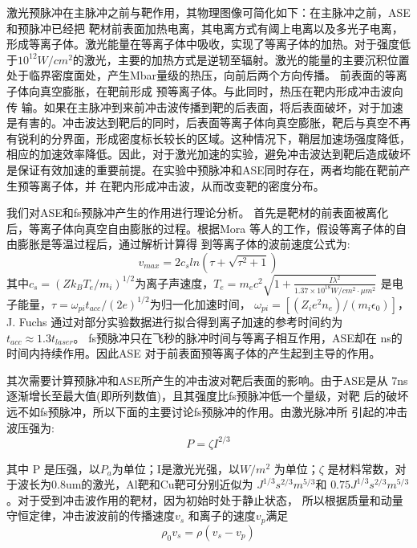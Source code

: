 激光预脉冲在主脉冲之前与靶作用，其物理图像可简化如下：在主脉冲之前，ASE和预脉冲已经把
靶材前表面加热电离，其电离方式有阈上电离以及多光子电离，形成等离子体。激光能量在等离子体中吸收，实现了等离子体的加热。对于强度低于$10^12W/{cm}^2$的激光，主要的加热方式是逆轫至辐射。激光的能量的主要沉积位置处于临界密度面处，产生Mbar量级的热压，向前后两个方向传播。 前表面的等离子体向真空膨胀，在靶前形成
预等离子体。与此同时，热压在靶内形成冲击波向传
输。如果在主脉冲到来前冲击波传播到靶的后表面，将后表面破坏，对于加速是有害的。冲击波达到靶后的同时，后表面等离子体向真空膨胀，靶后与真空不再有锐利的分界面，形成密度标长较长的区域。这种情况下，鞘层加速场强度降低，相应的加速效率降低。因此，对于激光加速的实验，避免冲击波达到靶后造成破坏是保证有效加速的重要前提。在实验中预脉冲和ASE同时存在，两者均能在靶前产生预等离子体，并
在靶内形成冲击波，从而改变靶的密度分布。


我们对ASE和fs预脉冲产生的作用进行理论分析。
首先是靶材的前表面被离化后，等离子体向真空自由膨胀的过程。根据Mora
等人的工作\cite{mora2003plasma,mora2005thin}，假设等离子体的自由膨胀是等温过程后，通过解析计算得
到等离子体的波前速度公式为:
\begin{equation}
\label{eqn:waveFrontVelocity}
v_{max}=2 c_s ln(\tau + \sqrt{{\tau}^2+1})
\end{equation}     
其中$c_s=(Z k_B T_e / m_i)^{1/2}$为离子声速度，$T_e=m_e c^2 \sqrt{1+\frac{I {\lambda}^2}{{1.37} \times {10}^{18} W/cm^2 \cdot \mu m^2}}$ 是电子能量\cite{kruer1985j}，$\tau={\omega}_{pi} t_{acc}/(2e)^{1/2}$为归一化加速时间， ${\omega}_{pi}=[(Z_i e^2 n_e)/(m_i {\epsilon}_0)]$，J. Fuchs \cite{fuchs2006laser} 通过对部分实验数据进行拟合得到离子加速的参考时间约为 $t_{acc} \approx 1.3 t_{laser}$。
fs预脉冲只在飞秒的脉冲时间与等离子相互作用，ASE却在
ns的时间内持续作用。因此ASE 对于前表面预等离子体的产生起到主导的作用。


其次需要计算预脉冲和ASE所产生的冲击波对靶后表面的影响。由于ASE是从
7ns逐渐增长至最大值(即所列数值)，且其强度比fs预脉冲低一个量级，对靶
后的破坏远不如fs预脉冲，所以下面的主要讨论fs预脉冲的作用。由激光脉冲所
引起的冲击波压强为\cite{lindl1995development}:
\begin{equation}
\label{eqn:shockPressure}
P= \zeta I ^{2/3}
\end{equation}     

其中 P 是压强，以$P_a$为单位；I是激光光强，以$W/m^2$ 为单位；$\zeta$ 是材料常数，对于波长为0.8um的激光，Al靶和Cu靶可分别近似为 $J^{1/3} s^{2/3} m^{5/3} $和
$0.75 J^{1/3} s^{2/3} m^{5/3} $
\cite{swift2004shock}。对于受到冲击波作用的靶材，因为初始时处于静止状态，
所以根据质量和动量守恒定律，冲击波波前的传播速度$v_s$ 和离子的速度$v_p$满足
\begin{equation}
\label{eqn:shockEquation1}
\rho_0 v_s = \rho (v_s - v_p)
\end{equation}     

